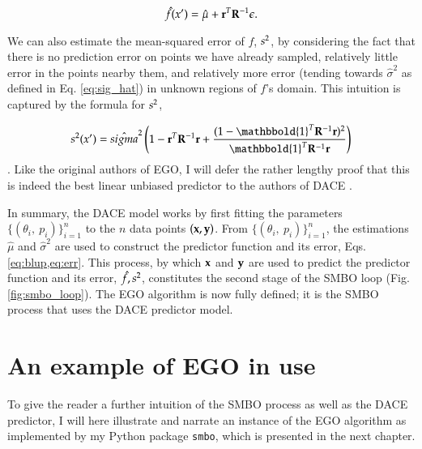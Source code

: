 \begin{equation}\label{eq:blup}
\hat{f}(x')=\hat{\mu} + \mathbf{r}^T\mathbf{R}^{-1}\mathbf{\epsilon}.
\end{equation}

We can also estimate the mean-squared error of $f$, $s^2$, by considering the fact that there is no prediction error on points we have already sampled, relatively little error in the points nearby them, and relatively more error (tending towards $\hat{\sigma}^2$ as defined in Eq. \ref{eq:sig_hat}) in unknown regions of $f$'s domain. This intuition is captured by the formula for $s^2$,

\begin{equation}\label{eq:err}
\err(x') = \hat{sigma}^2 \left(1 - \mb{r}^T\mb{R}^{-1}\mb{r} + \frac{(1 - \mathbbold{1}^T\mb{R}^{-1}\mb{r})^2}{\mathbbold{1}^T\mb{R}^{-1}\mb{r}} \right)
\end{equation}.
Like the original authors of EGO, I will defer the rather lengthy proof that this is indeed the best linear unbiased predictor to the authors of DACE \cite{jones_efficient_1998,sacks_design_1989}.

In summary, the DACE model works by first fitting the parameters $\{(\theta_i,\ p_i)\}_{i=1}^n$ to the $n$ data points $(\mathbf{x},\mathbf{y})$. From $\{(\theta_i,\ p_i)\}_{i=1}^n$, the estimations $\hat{\mu}$ and $\hat{\sigma}^2$ are used to construct the predictor function and its error, Eqs. \ref{eq:blup,eq:err}. This process, by which $\mathbf{x}$ and $\mathbf{y}$ are used to predict the predictor function and its error, $\hat{f},s^2$, constitutes the second stage of the SMBO loop (Fig. \ref{fig:smbo_loop}). The EGO algorithm is now fully defined; it is the SMBO process that uses the DACE predictor model.

\section{An example of EGO in use}
To give the reader a further intuition of the SMBO process as well as the DACE predictor, I will here illustrate and narrate an instance of the EGO algorithm as implemented by my Python package \texttt{smbo}, which is presented in the next chapter.

